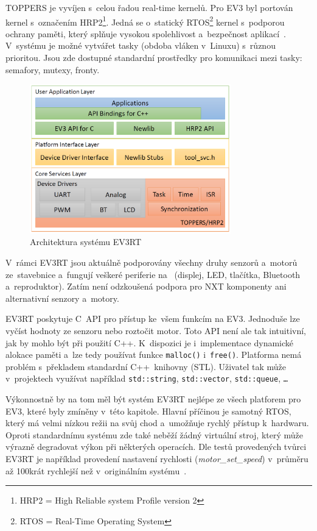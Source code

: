 TOPPERS je vyvíjen s~celou řadou real-time kernelů. Pro EV3 byl portován kernel s~označením HRP2\footnote{HRP2 = High Reliable system Profile version 2}.
Jedná se o~statický RTOS\footnote{RTOS = Real-Time Operating System} kernel s~podporou ochrany paměti, který splňuje vysokou spolehlivost a~bezpečnost aplikací~\cite{legoProgramingPlatform_EV3RT-paper}.
V~systému je možné vytvářet tasky (obdoba vláken v~Linuxu) s~různou prioritou. 
Jsou zde dostupné standardní prostředky pro komunikaci mezi tasky: semafory, mutexy, fronty.

\begin{figure}[h]
	\centering
	\includegraphics[width=330px]{images/ev3rt-architecture.png}
	\caption[Architektura systému EV3RT]{Architektura systému EV3RT\protect\footnotemark}
	\label{ev3rt-architecture}
\end{figure}


V~rámci EV3RT jsou aktuálně podporovány všechny druhy senzorů a~motorů ze~stavebnice \legoEV{} a~fungují veškeré periferie na~ (displej, LED, tlačítka, Bluetooth a~reproduktor). 
Zatím není odzkoušená podpora pro NXT komponenty ani alternativní senzory a~motory. 

EV3RT poskytuje C~API pro přístup ke~všem funkcím na EV3. 
Jednoduše lze vyčíst hodnoty ze senzoru nebo roztočit motor.
Toto API není ale tak intuitivní, jak by mohlo být při použití C++.
K~dispozici je i~implementace dynamické alokace paměti a~lze tedy používat funkce \verb|malloc()| i~\verb|free()|.
Platforma nemá problém s~překladem standardní C++~knihovny (STL).
Uživatel tak může v~projektech využívat například \texttt{std::string}, \texttt{std::vector}, \texttt{std::queue}, \texttt{\dots}

Výkonnostně by na tom měl být systém EV3RT nejlépe ze všech platforem pro EV3, které byly zmíněny v~této kapitole. 
Hlavní příčinou je samotný RTOS, který má velmi nízkou režii na svůj chod a~umožňuje rychlý přístup k~hardwaru. %
Oproti standardnímu \lego{} systému zde také neběží žádný virtuální stroj, který může výrazně degradovat výkon při některých operacích. 
Dle testů provedených tvůrci EV3RT je například provedení nastavení rychlosti ({\it motor\_set\_speed}) v~průměru až 100krát
 rychlejší než v~originálním systému~\cite{legoProgramingPlatform_EV3RT-paper}. \\
 
